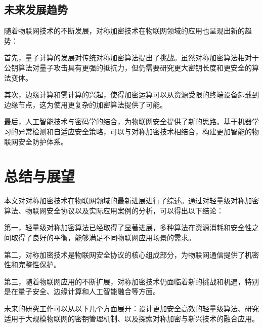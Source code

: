 \section{未来发展趋势}

随着物联网技术的不断发展，对称加密技术在物联网领域的应用也呈现出新的趋势：

首先，量子计算的发展对传统对称加密算法提出了挑战。虽然对称加密算法相对于公钥算法对量子攻击具有更强的抵抗力，但仍需要研究更大密钥长度和更安全的算法变体。

其次，边缘计算和雾计算的兴起，使得加密运算可以从资源受限的终端设备卸载到边缘节点，这为使用更复杂的加密算法提供了可能。

最后，人工智能技术与密码学的结合，为物联网安全提供了新的思路。基于机器学习的异常检测和自适应安全策略，可以与对称加密技术相结合，构建更加智能的物联网安全防护体系。

\chapter{总结与展望}

本文对对称加密技术在物联网领域的最新进展进行了综述。通过对轻量级对称加密算法、物联网安全协议以及实际应用案例的分析，可以得出以下结论：

第一，轻量级对称加密算法已经取得了显著进展，多种算法在资源消耗和安全性之间取得了良好的平衡，能够满足不同物联网应用场景的需求。

第二，对称加密技术是物联网安全协议的核心组成部分，为物联网通信提供了机密性和完整性保护。

第三，随着物联网应用的不断扩展，对称加密技术仍面临着新的挑战和机遇，特别是在量子安全、边缘计算和人工智能融合等方面。

未来的研究工作可以从以下几个方面展开：设计更加安全高效的轻量级算法、研究适用于大规模物联网的密钥管理机制、以及探索对称加密与新兴技术的融合应用。
